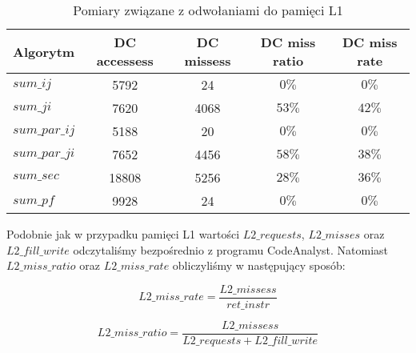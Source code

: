 \begin{table}[H]
\caption{Pomiary związane z odwołaniami do pamięci L1}

\begin{tabular}{|l|c|c|c|c|}

\hline
  Algorytm &
  DC accessess &
  DC missess &
  DC miss ratio &
  DC miss rate \\

\hline
  $sum\_ij$ &
  5792 &
  24 &
  $0\%$ &
  $0\%$ \\

\hline
  $sum\_ji$ &
  7620 &
  4068 &
  $53\%$ &
  $42\%$ \\

\hline
  $sum\_par\_ij$ &
  5188 &
  20 &
  $0\%$ &
  $0\%$ \\

\hline
  $sum\_par\_ji$ &
  7652 &
  4456 &
  $58\%$ &
  $38\%$ \\

\hline
  $sum\_sec$ &
  18808 &
  5256 &
  $28\%$ &
  $36\%$ \\

\hline
  $sum\_pf$ &
  9928 &
  24 &
  $0\%$ &
  $0\%$ \\

\hline

\end{tabular}

\end{table}

Podobnie jak w przypadku pamięci L1 wartości $L2\_requests$, $L2\_misses$ oraz $L2\_fill\_write$ odczytaliśmy bezpośrednio z programu CodeAnalyst. Natomiast $L2\_miss\_ratio$ oraz $L2\_miss\_rate$ obliczyliśmy w następujący sposób:

\begin{equation}
  L2\_miss\_rate = \frac{L2\_missess}{ret\_instr}
\end{equation}

\begin{equation}
  L2\_miss\_ratio = \frac{L2\_missess}{L2\_requests + L2\_fill\_write}
\end{equation}

